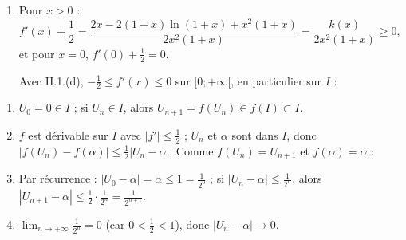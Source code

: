 \begin{description}
\begin{description}
\begin{enumerate}
			\item {}
				Pour $x > 0$ :
				\[
					f'(x) + \frac{1}{2} = \frac{2x - 2(1+x)\ln(1+x) + x^2(1+x)}{2x^2(1+x)} = \frac{k(x)}{2x^2(1+x)} \geq 0 ,
				\]
				et pour $x = 0$, $f'(0) + \frac{1}{2} = 0$. \par\noindent{}
				Avec II.1.(d), $-\frac{1}{2} \leq f'(x) \leq 0$ sur $[0;+\infty[$, en particulier sur $I$ :
				\par\noindent{}
		\end{enumerate}
		\item[II. ]
		\begin{enumerate}
			\item {}
				$U_0 = 0 \in I$ ; si $U_n \in I$, alors $U_{n+1} = f(U_n) \in f(I) \subset I$.
				\par\noindent{}
			\item {}
				$f$ est dérivable sur $I$ avec $|f'| \leq \frac{1}{2}$ ; $U_n$ et $\alpha$ sont dans $I$, donc
				$|f(U_n) - f(\alpha)| \leq \frac{1}{2}|U_n - \alpha|$. Comme $f(U_n) = U_{n+1}$ et $f(\alpha) = \alpha$ :
				\par\noindent{}
			\item {}
				Par récurrence : $|U_0 - \alpha| = \alpha \leq 1 = \frac{1}{2^0}$ ; si $|U_n - \alpha| \leq \frac{1}{2^n}$, alors
				$|U_{n+1} - \alpha| \leq \frac{1}{2} \cdot \frac{1}{2^n} = \frac{1}{2^{n+1}}$.
				\par\noindent{}
			\item {}
				$\lim_{n\to+\infty} \frac{1}{2^n} = 0$ (car $0 < \frac{1}{2} < 1$), donc $|U_n - \alpha| \to 0$.
				\par\noindent{}
		\end{enumerate}
	\end{description}
\end{description}
